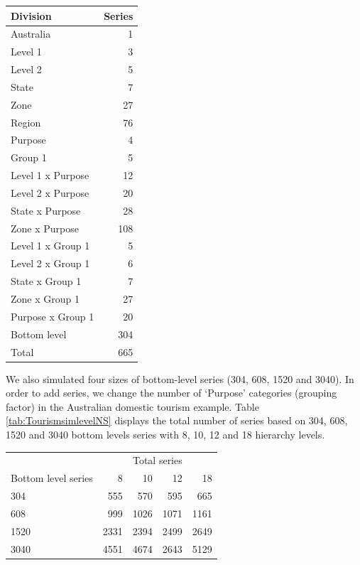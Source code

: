 \documentclass[11pt,a4paper,]{article}
\let\origtable\table
\let\endorigtable\endtable
\renewenvironment{table}[1][2] {
    \expandafter\origtable\expandafter[!htbp]
} {
    \endorigtable
}
\begin{document}
\begin{table}[!h]

\caption{\label{tab:simlevel1level2group1}Number of simulated Australian domestic tourism series at each aggregation level - adding two hierarchy and one grouping variables (Level 1, Level 2 and Group 1)}
\centering
\begin{tabular}[t]{lr}
\toprule
Division & Series\\
\midrule
Australia & 1\\
Level 1 & 3\\
Level 2 & 5\\
State & 7\\
Zone & 27\\
Region & 76\\
Purpose & 4\\
Group 1 & 5\\
Level 1 x Purpose & 12\\
Level 2 x Purpose & 20\\
State x Purpose & 28\\
Zone x Purpose & 108\\
Level 1 x Group 1 & 5\\
Level 2 x Group 1 & 6\\
State x Group 1 & 7\\
Zone x Group 1 & 27\\
Purpose x Group 1 & 20\\
Bottom level & 304\\
\hline
Total & 665\\
\bottomrule
\end{tabular}
\end{table}

We also simulated four sizes of bottom-level series (304, 608, 1520 and 3040). In order to add series, we change the number of `Purpose' categories (grouping factor) in the Australian domestic tourism example. Table \ref{tab:TourismsimlevelNS} displays the total number of series based on 304, 608, 1520 and 3040 bottom levels series with 8, 10, 12 and 18 hierarchy levels.

\begin{table}

\caption{\label{tab:TourismsimlevelNS}Total number of the series in the hierarchy structure based on the different number of series with 8, 10, 12 and 18 levels of the hierarchy.}
\centering
\begin{tabular}[t]{lrrrr}
\toprule
\multicolumn{1}{c}{} & \multicolumn{4}{c}{Total series} \\
\cmidrule(l{3pt}r{3pt}){2-5}
Bottom level series & 8 & 10 & 12 & 18\\
\midrule
304 & 555 & 570 & 595 & 665\\
608 & 999 & 1026 & 1071 & 1161\\
1520 & 2331 & 2394 & 2499 & 2649\\
3040 & 4551 & 4674 & 2643 & 5129\\
\bottomrule
\end{tabular}
\end{table}
\end{document}
